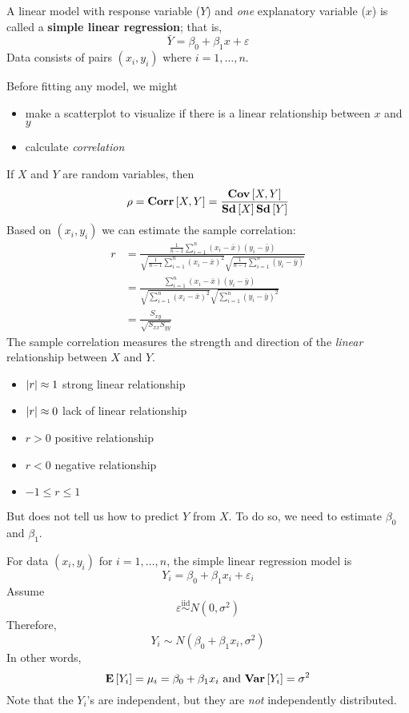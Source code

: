 
A linear model with response variable ($ Y $)
and \emph{one} explanatory variable ($ x $)
is called a \textbf{simple linear regression}; that is,
\[ \bar{Y}=\beta_0+\beta_1x+\varepsilon \]
Data consists of pairs $ (x_i,y_i) $
where $ i=1,\ldots,n $.

Before fitting any model, we might
\begin{itemize}
    \item make a scatterplot to visualize if there
          is a linear relationship between $ x $ and $ y $
    \item calculate \emph{correlation}
\end{itemize}
If $ X $ and $ Y $ are random variables,
then
\[ \rho=\bm{\mathrm{Corr}}\left[X,Y\right]=\frac{\bm{\mathrm{Cov}}\left[X,Y\right]}{\bm{\mathrm{Sd}}\left[X\right]\bm{\mathrm{Sd}}\left[Y\right]}  \]
Based on $ (x_i,y_i) $ we can estimate the sample correlation:
\begin{align*}
    r
     & =\frac{\frac{1}{n-1} \sum\limits_{i=1}^{n}(x_i-\bar{x})(y_i-\bar{y})}
    {\sqrt{\frac{1}{n-1}\sum\limits_{i=1}^{n} (x_i-\bar{x})^2}
        \sqrt{\frac{1}{n-1}\sum\limits_{i=1}^{n}(y_i-\bar{y})}}              \\
     & =\frac{\sum\limits_{i=1}^{n} (x_i-\bar{x})(y_i-\bar{y})}{
        \sqrt{\sum\limits_{i=1}^{n} (x_i-\bar{x})^2}
        \sqrt{\sum\limits_{i=1}^{n} (y_i-\bar{y})^2}
    }                                                                        \\
     & =\frac{S_{xy}}{\sqrt{S_{xx}S_{yy}}}
\end{align*}
The sample correlation measures the strength and direction of
the \emph{linear} relationship
between $ X $ and $ Y $.
\begin{itemize}
    \item $ \lvert r\rvert\approx 1 $ strong linear relationship
    \item $ \lvert r\rvert\approx 0 $ lack of linear relationship
    \item $ r>0 $ positive relationship
    \item $ r<0 $ negative relationship
    \item $ -1\leqslant r\leqslant 1 $
\end{itemize}
But does not tell us how to predict $ Y $ from $ X $. To do so,
we need to estimate $ \beta_0 $ and $ \beta_1 $.

For data $ (x_i,y_i) $ for $ i=1,\ldots,n $, the
simple linear regression model is
\[ Y_i=\beta_0+\beta_1x_i+\varepsilon_i \]
Assume
\[ \varepsilon\stackrel{\text{iid}}{\sim}N(0,\sigma^2) \]
Therefore,
\[ Y_i\sim N(\beta_0+\beta_1x_i,\sigma^2) \]
In other words, \[
    \bm{\mathrm{E}}\left[Y_i\right]=\mu_i=\beta_0+\beta_1x_i \text{ and }
    \bm{\mathrm{Var}}\left[Y_i\right]=\sigma^2 \]
Note that the $ Y_i $'s are independent, but they are \emph{not}
independently distributed.

